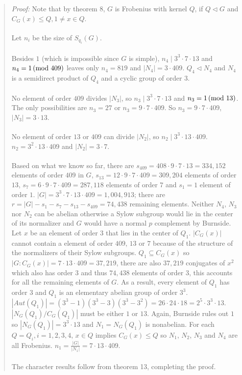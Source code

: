 \begin{quote}
\emph{Proof:}
Note that by theorem 8, $G$ is Frobenius with kernel $Q$, if $Q\lhd G$ and $C_G(x) \leq Q, 1 \ne x \in Q$.
\\
\\
Let $n_i$ be the size of $S_{q_i}(G)$.
\\
\\
Besides $1$ (which is impossible since $G$ is simple), $n_4 \mid 3^3 \cdot 7 \cdot 13$ and $n_4 = 1 \thinspace \textnormal{(mod } 409 \textnormal{)}$
leaves only $n_4 = 819$ and $|N_4| = 3 \cdot 409$.  $Q_4 \lhd N_4$ and $N_4$ is a semidirect product of $Q_4$ and a cyclic group of order $3$.
\\
\\
No element of order $409$ divides $|N_3|$, so $n_3 \mid 3^3 \cdot 7 \cdot 13$ and $n_3 = 1 \thinspace \textnormal{(mod } 13 \textnormal{)}$.  The only possibilities are
$n_3 =27$ or
$n_3 = 9 \cdot 7 \cdot 409$. So $n_3 = 9 \cdot 7 \cdot 409$, $|N_3|= 3 \cdot 13$.
\\
\\
No element of order $13$ or $409$ can divide $|N_2|$, so $n_2 \mid 3^3 \cdot 13 \cdot 409$.
$n_2 = 3^2 \cdot 13 \cdot 409$ and $|N_2|= 3 \cdot 7$.
\\
\\
Based on what we know so far, there are $s_{409}= 408 \cdot 9 \cdot 7 \cdot 13 = 334,152$ elements of order $409$ in $G$,
$s_{13} = 12 \cdot 9 \cdot 7 \cdot 409= 309,204$ elements of order $13$, $s_{7}=  6 \cdot 9 \cdot 7 \cdot 409 = 287,118$
elements of order $7$ and $s_{1}= 1$ element of order $1$.  $|G|= 3^3 \cdot 7 \cdot 13 \cdot 409= 1,004,913$; there are
$r= |G| - s_{1} - s_{7} -s_{13} - s_{409}= 74,438$ remaining elements.
Neither $N_4$, $N_3$ nor $N_2$ can be abelian otherwise a Sylow subgroup would lie in the center of its normalizer and $G$
would have a normal $p$ complement by Burnside.  Let $x$ be an element of order $3$ that lies in 
the center of $Q_1$.
$|C_G(x)|$ cannot contain a element of order $409$, $13$ or $7$ because of the structure of the normalizers of their Sylow subgroups.
$Q_1 \subseteq C_G(x)$ so $|G:C_G(x)| = 7 \cdot 13 \cdot 409= 37,219$,
there are also $37,219$ conjugates of $x^2$ which also has order $3$ and thus $74,438$ elements of order $3$, this
accounts for all the remaining elements
of $G$.  As a result, every element of $Q_1$ has order $3$ and $Q_1$ is an elementary abelian group of order $3^3$.
$|Aut(Q_1)|= (3^3-1)(3^3 - 3)(3^3 - 3^2)= 26 \cdot 24 \cdot 18 = 2^5 \cdot 3^3 \cdot 13$.
$|N_G(Q_1)/C_G(Q_1)|$ must be either $1$ or $13$.
Again, Burnside rules out $1$ so $|N_G(Q_1)|= 3^3 \cdot 13$ and $N_1=N_G(Q_1)$ is nonabelian.
For each $Q= Q_i, i = 1,2,3,4$, $x \in Q$ implies
$C_G(x) \leq Q$ so $N_1$, $N_2$, $N_3$ and $N_4$ are all Frobenius.
$n_1 = {\frac {|G|} {|N_1|}}= 7 \cdot 13 \cdot 409$.
\\
\\
The character results follow from theorem 13, completing the proof.
\end{quote}
